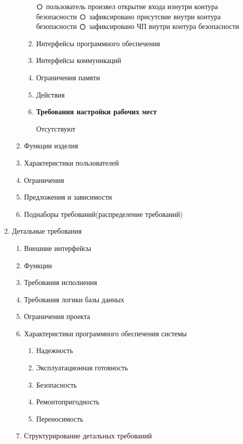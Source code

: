 \documentclass[12pt]{article} %
\def\circmark{\mathbin{\scalerel*{\circ}{j}}}
\begin{document}
\begin{enumerate}
\begin{enumerate}
\begin{enumerate}
            $\circmark $ пользователь произвел открытие входа изнутри контура безопасности \newline
            $\circmark $ зафиксировано присутсвие внутри контура безопасности \newline
            $\circmark $ зафиксировано ЧП внутри контура безопасности \newline
  				\item Интерфейсы программного обеспечения
  				\item Интерфейсы коммуникаций
  				\item Ограничения памяти
  				\item Действия
          \item \begin{large} \textbf{Требования настройки рабочих мест} \end{large} \newline
          Отсутствуют
  			\end{enumerate}
  		\item Функции изделия
  		\item Характеристики пользователей
  		\item Ограничения
  		\item Предложения и зависимости
  		\item Поднаборы требований(распределение требований)
  	\end{enumerate}
  \item Детальные требования
  	\begin{enumerate}
  		\item Внешние интерфейсы
  		\item Функции
  		\item Требования исполнения
  		\item Требования логики базы данных
  		\item Ограничения проекта
  		\item Характеристики программного обеспечения системы
  			\begin{enumerate}
  				\item Надежность
  				\item Эксплуатационная готовность
  				\item Безопасность
  				\item Ремонтопригодность
  				\item Переносимость
  			\end{enumerate}
  		\item Структурирование детальных требований
  			\begin{enumerate}

\end{enumerate}
\end{enumerate}
\end{enumerate}
\end{document}
